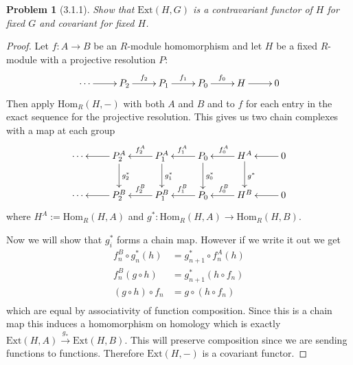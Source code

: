 \documentclass[10pt]{article}
\newcommand{\Ext}{\mathrm{Ext}}
\newcommand{\Hom}{\mathrm{Hom}}
\theoremstyle{plain}
\newtheorem{problem}{Problem}
\theoremstyle{remark}
\begin{document}
\begin{problem}[3.1.1]
  Show that $\Ext(H,G)$ is a contravariant functor of $H$ for fixed $G$ and
  covariant for fixed $H$.
\end{problem}

\begin{proof}
  Let $f:A\rightarrow B$ be an $R$-module homomorphism and let $H$ be a fixed
  $R$-module with a projective resolution $P$:
  \[
    \xymatrix{
      \cdots \ar[r] & P_2 \ar[r]^{f_2}& P_1 \ar[r]^{f_1} & P_0 \ar[r]^{f_0} & H \ar[r] & 0
    }
  \]
  Then apply $\Hom_R(H,-)$ with both $A$ and $B$ and to $f$ for each entry in
  the exact sequence for the projective resolution. This gives us two chain
  complexes with a map at each group
  \[
    \xymatrix{
      \cdots & \ar[l] P_2^A \ar[d]^{g_2^*}& \ar[l]_{f_2^A} P_1^A \ar[d]^{g_1^*}& \ar[l]_{f_1^A} P_0 \ar[d]^{g_0^*}& \ar[l]_{f_0^A} H^A\ar[d]^{g^*} & \ar[l] 0\\
      \cdots & \ar[l] P_2^B & \ar[l]_{f_2^B} P_1^B & \ar[l]_{f_1^B} P_0 & \ar[l]_{f_0^B} H^B & \ar[l] 0
    }
  \]
  where $H^A:=\Hom_R(H,A)$ and $g^*:\Hom_R(H,A)\rightarrow\Hom_R(H,B)$.

  Now we will show that $g_i^*$ forms a chain map. However if we write it out we
  get
  \begin{align*}
    f_n^B\circ g_n^*(h)&=g_{n+1}^*\circ f_n^A(h)\\
    f_n^B(g\circ h) &= g_{n+1}^*(h\circ f_n)\\
    (g\circ h)\circ f_n &= g\circ(h\circ f_n)\\
  \end{align*}
  which are equal by associativity of function composition. Since
  this is a chain map this induces a homomorphism on homology which
  is exactly $\Ext(H,A)\xrightarrow{g_*}\Ext(H,B)$. This will preserve
  composition since we are sending functions to functions. Therefore
  $\Ext(H,-)$ is a covariant functor.


\end{proof}
\end{document}
